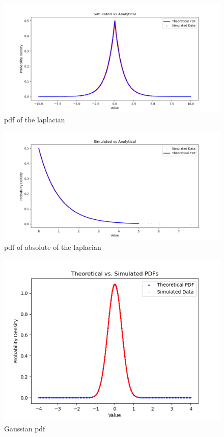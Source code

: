 \documentclass[journal,12pt,twocolumn]{IEEEtran}
\begin{document}
\begin{figure}[ht]
\includegraphics[width=\columnwidth]{./figs/Figure_1.png}
\caption{pdf of the laplacian}
\label{fig:2023/ST/61/1}
\end{figure}
\begin{figure}[ht]
\includegraphics[width=\columnwidth]{./figs/Figure_2.png}
\caption{pdf of absolute of the laplacian}
\label{fig:2023/ST/61/2}
\end{figure}
\begin{figure}[ht]
\includegraphics[width=\columnwidth]{./figs/Figure_3.png}
\caption{Gaussian pdf}
\label{fig:2023/ST/61/3}
\end{figure}
\end{document}

